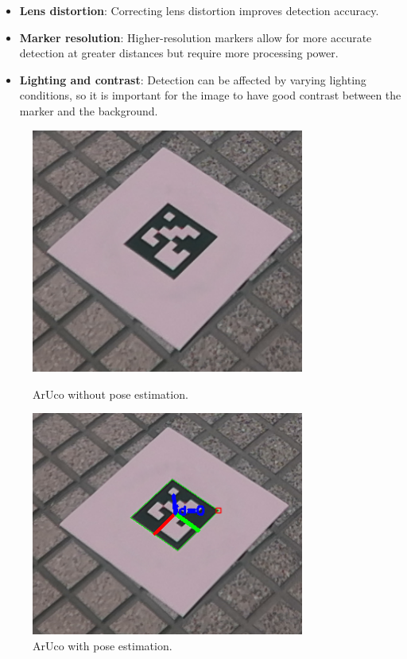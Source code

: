     \begin{itemize}
        \item \textbf{Lens distortion}: Correcting lens distortion improves detection accuracy.
        \item \textbf{Marker resolution}: Higher-resolution markers allow for more accurate detection at greater distances but require more processing power.
        \item \textbf{Lighting and contrast}: Detection can be affected by varying lighting conditions, so it is important for the image to have good contrast between the marker and the background.
    \end{itemize}

    \begin{figure}[H] 
        \centering 
            \begin{minipage}{0.48\textwidth}
                \includegraphics[width=0.8\textwidth]{pictures/aruco_no_pose_estimation.png} %
                \caption{ArUco without pose estimation.} 
                \label{fig:aruco_no_pose_estimation}
            \end{minipage}
            \begin{minipage}{0.48\textwidth}
                \includegraphics[width=0.8\textwidth]{pictures/aruco_pose_estimation.png} %
                \caption{ArUco with pose estimation.} 
                \label{fig:aruco_pose_estimation}
            \end{minipage}
    \end{figure}

